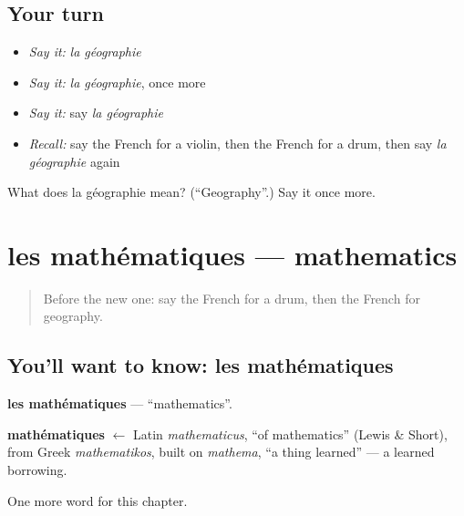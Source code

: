 \subsection*{Your turn}
\begin{itemize}
\raggedright
  \item \emph{Say it:} \emph{la géographie}
  \item \emph{Say it:} \emph{la géographie}, once more
  \item \emph{Say it:} say \emph{la géographie}
  \item \emph{Recall:} say the French for a violin, then the French for a drum, then say \emph{la géographie} again
\end{itemize}

\begin{tcolorbox}[breakable,colback=teal!4,colframe=teal!35!black,title={Before you move on}]
What does la géographie mean? (\textquotedblleft{}Geography\textquotedblright{}.) Say it once more.
\end{tcolorbox}
\section[les mathématiques]{les mathématiques — mathematics}

\label{lesson:FR-C257-mathematiques}



\begin{quote}
Before the new one: say the French for a drum, then the French for geography.
\end{quote}

\subsection*{You'll want to know: les mathématiques}
\textbf{les mathématiques} — \textquotedblleft{}mathematics\textquotedblright{}.

\begin{cousinweb}
\textbf{mathématiques} $\leftarrow$ Latin \emph{mathematicus}, \textquotedblleft{}of mathematics\textquotedblright{} (Lewis \& Short), from Greek \emph{mathematikos}, built on \emph{mathema}, \textquotedblleft{}a thing learned\textquotedblright{} — a learned borrowing.
\end{cousinweb}

\begin{grammarlens}[title={What you've built}]
One more word for this chapter.
\end{grammarlens}

